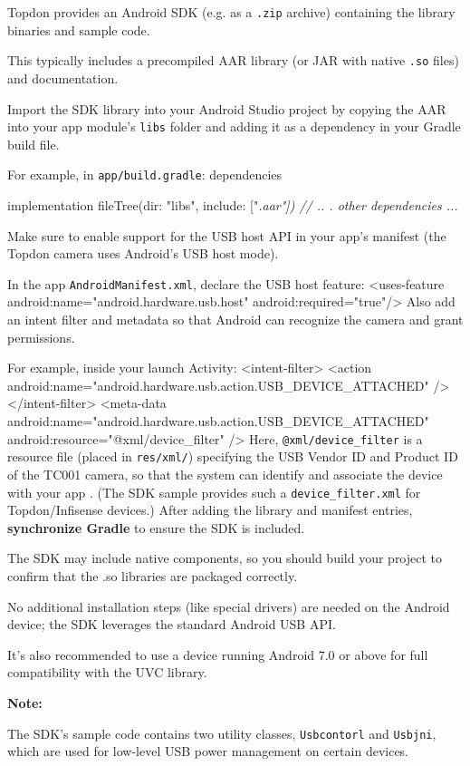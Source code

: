 Topdon provides an Android SDK (e.g. as a \texttt{.zip} archive) containing the
library binaries and sample code.

This typically includes a precompiled AAR library (or JAR with native
\texttt{.so} files) and documentation.

Import the SDK library into your Android Studio project by copying the AAR into
your app module's \texttt{libs} folder and adding it as a dependency in your
Gradle build file.

For example, in \texttt{app/build.gradle}: dependencies { implementation fileTree(dir: "libs", include: ["\textit{.aar"]) // ..
. other dependencies ... }

Make sure to enable support for the USB host API in your app's manifest (the
Topdon camera uses Android's USB host mode).

In the app \texttt{AndroidManifest.xml}, declare the USB host feature:
<uses-feature android:name="android.hardware.usb.host" android:required="true"/>
Also add an intent filter and metadata so that Android can recognize the camera
and grant permissions.

For example, inside your launch Activity: <intent-filter> <action android:name="android.hardware.usb.action.USB_DEVICE_ATTACHED" /> </intent-filter> <meta-data android:name="android.hardware.usb.action.USB_DEVICE_ATTACHED" android:resource="@xml/device_filter" /> Here, \texttt{@xml/device_filter} is a resource file (placed in \texttt{res/xml/}) specifying the USB Vendor ID and Product ID of the TC001 camera, so that the system can identify and associate the device with your app
.
(The SDK sample provides such a \texttt{device_filter.xml} for Topdon/Infisense devices.) After adding the library and manifest entries, \textbf{synchronize Gradle}
 to ensure the SDK is included.

The SDK may include native components, so you should build your project to
confirm that the .so libraries are packaged correctly.

No additional installation steps (like special drivers) are needed on the
Android device; the SDK leverages the standard Android USB API.

It's also recommended to use a device running Android 7.0 or above for full
compatibility with the UVC library.

\textbf{Note:}

The SDK's sample code contains two utility classes, \texttt{Usbcontorl} and
\texttt{Usbjni}, which are used for low-level USB power management on certain
devices.

}

